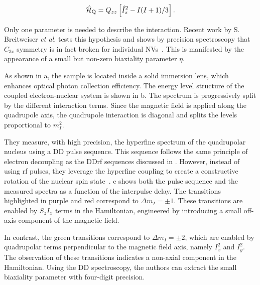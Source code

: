\begin{equation}
    \hat{\mathcal{H}}_{\text{Q}} = Q_{zz} \left[\hat{I}_z^2 - I(I+1)/3\right].
\end{equation} 

Only one parameter is needed to describe the interaction. Recent work by S. Breitweiser \textit{et al.} tests this hypothesis and shows by precision spectroscopy that $C_{3v}$ symmetry is in fact broken for individual NVs~. This is manifested by the appearance of a small but non-zero biaxiality parameter $\eta$.

As shown in a, the sample is located inside a solid immersion lens, which enhances optical photon collection efficiency. The energy level structure of the coupled electron-nuclear system is shown in b. The spectrum is progressively split by the different interaction terms. Since the magnetic field is applied along the quadrupole axis, the quadrupole interaction is diagonal and splits the levels proportional to $m_I^2$.

They measure, with high precision, the hyperfine spectrum of the quadrupolar nucleus using a DD pulse sequence. This sequence follows the same principle of electron decoupling as the DDrf sequences discussed in . However, instead of using rf pulses, they leverage the hyperfine coupling to create a constructive rotation of the nuclear spin state~. c shows both the pulse sequence and the measured spectra as a function of the interpulse delay. The transitions highlighted in purple and red correspond to $\Delta m_I = \pm 1$. These transitions are enabled by $S_z I_x$ terms in the Hamiltonian, engineered by introducing a small off-axis component of the magnetic field.

In contrast, the green transitions correspond to $\Delta m_I = \pm 2$, which are enabled by quadrupolar terms perpendicular to the magnetic field axis, namely $I_x^2$ and $I_y^2$. The observation of these transitions indicates a non-axial component in the Hamiltonian. Using the DD spectroscopy, the authors can extract the small biaxiality parameter with four-digit precision.


